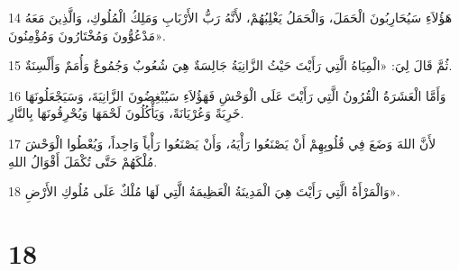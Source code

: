 \par 14 هَؤُلاَءِ سَيُحَارِبُونَ الْحَمَلَ، وَالْحَمَلُ يَغْلِبُهُمْ، لأَنَّهُ رَبُّ الأَرْبَابِ وَمَلِكُ الْمُلُوكِ، وَالَّذِينَ مَعَهُ مَدْعُوُّونَ وَمُخْتَارُونَ وَمُؤْمِنُونَ».
\par 15 ثُمَّ قَالَ لِيَ: «الْمِيَاهُ الَّتِي رَأَيْتَ حَيْثُ الزَّانِيَةُ جَالِسَةٌ هِيَ شُعُوبٌ وَجُمُوعٌ وَأُمَمٌ وَأَلْسِنَةٌ.
\par 16 وَأَمَّا الْعَشَرَةُ الْقُرُونُ الَّتِي رَأَيْتَ عَلَى الْوَحْشِ فَهَؤُلاَءِ سَيُبْغِضُونَ الزَّانِيَةَ، وَسَيَجْعَلُونَهَا خَرِبَةً وَعُرْيَانَةً، وَيَأْكُلُونَ لَحْمَهَا وَيُحْرِقُونَهَا بِالنَّارِ.
\par 17 لأَنَّ اللهَ وَضَعَ فِي قُلُوبِهِمْ أَنْ يَصْنَعُوا رَأْيَهُ، وَأَنْ يَصْنَعُوا رَأْياً وَاحِداً، وَيُعْطُوا الْوَحْشَ مُلْكَهُمْ حَتَّى تُكْمَلَ أَقْوَالُ اللهِ.
\par 18 وَالْمَرْأَةُ الَّتِي رَأَيْتَ هِيَ الْمَدِينَةُ الْعَظِيمَةُ الَّتِي لَهَا مُلْكٌ عَلَى مُلُوكِ الأَرْضِ».

\chapter{18}

